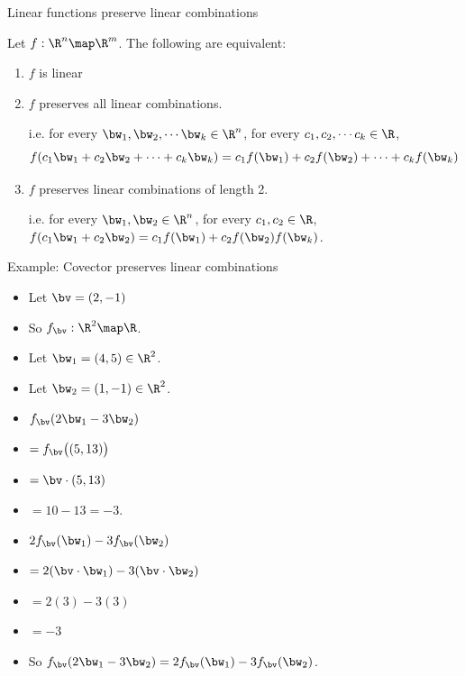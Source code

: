 \documentclass{beamer}
\begin{document}
\begin{frame}{Linear functions preserve linear combinations}
\begin{lemma}
Let $f:\R^n\map\R^m$. The following are equivalent:
\begin{enumerate}
\item $f$ is linear
\item $f$ preserves all linear combinations.

\pause

i.e. for every
$\bw_1,\bw_2,\cdots\bw_k\in\R^n$, for every $c_1,c_2,\cdots c_k\in\R$,
$$f(c_1 \bw_1 + c_2 \bw_2 + \cdots + c_k \bw_k) = c_1 f(\bw_1) + c_2 f(\bw_2) + \cdots + c_k f(\bw_k)$$

\pause

\item $f$ preserves linear combinations of length 2.

\pause

i.e. for every $\bw_1,\bw_2\in\R^n$, for every $c_1,c_2\in\R$,
$f(c_1 \bw_1 + c_2 \bw_2) = c_1 f(\bw_1) + c_2 f(\bw_2) f(\bw_k)$.

\end{enumerate}
\end{lemma}
\end{frame}


\begin{frame}{Example: Covector preserves linear combinations}

\begin{itemize}
\item Let $\bv = (2, -1)$
\item So $f_{\bv}:\R^2 \map \R$.
\item Let $\bw_1 = (4, 5) \in \R^2$.
\item Let $\bw_2 = (1,-1) \in \R^2$.
\item $f_\bv(2\bw_1 -3\bw_2)$
\item $=f_\bv\bigl((5, 13)\bigr)$
\item $=\bv \cdot (5, 13)$
\item $=10 - 13 = -3$.
\item $2 f_{\bv}(\bw_1) -3 f_{\bv}(\bw_2)$
\item $= 2 (\bv \cdot \bw_1) -3 (\bv \cdot \bw_2)$
\item $=2 (3) - 3(3)$
\item $=-3$
\item So $f_\bv(2\bw_1 -3\bw_2) = 2f_{\bv}(\bw_1) -3 f_{\bv}(\bw_2)$.
\end{itemize}

\end{frame}
\end{document}
